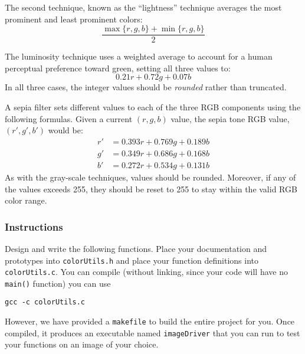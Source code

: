 \documentclass[12pt]{scrartcl}
\begin{document}
The second technique, known as the ``lightness'' technique averages 
the most prominent and least prominent colors:
  $$\frac{\max\{r, g, b\} + \min\{r, g, b\}}{2}$$

The luminosity technique uses a weighted average to account for a human 
perceptual preference toward green, setting all three values to:
  $$0.21 r + 0.72 g + 0.07 b$$
In all three cases, the integer values should be \emph{rounded} rather 
than truncated.

A sepia filter sets different values to each of the three RGB components 
using the following formulas.  Given a current $(r,g,b)$ value, the sepia
tone RGB value, $(r',g',b')$ would be:
$$\begin{array}{ll}
  r' &= 0.393r + 0.769g + 0.189b \\
  g' &= 0.349r + 0.686g + 0.168b \\
  b' &= 0.272r + 0.534g + 0.131b
\end{array}$$
As with the gray-scale techniques, values should be rounded.  Moreover, if
any of the values exceeds 255, they should be reset to 255 to stay within
the valid RGB color range.

\subsubsection*{Instructions}

Design and write the following functions.  Place your documentation 
and prototypes into \texttt{colorUtils.h} and place your 
function definitions into \texttt{colorUtils.c}.  You can
compile (without linking, since your code will have no \texttt{main()}
function) you can use 

\texttt{gcc -c colorUtils.c}

However, we have provided a \texttt{makefile} to build the 
entire project for you.  Once compiled, it produces an executable
named \texttt{imageDriver} that you can run to test your
functions on an image of your choice.
\end{document}
